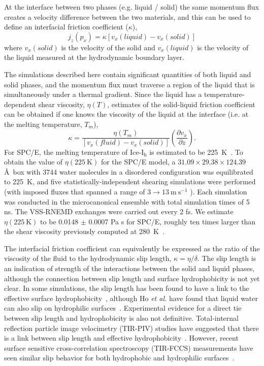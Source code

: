At the interface between two phases (e.g. liquid / solid) the same
momentum flux creates a velocity difference between the two materials,
and this can be used to define an interfacial friction coefficient
($\kappa$),
\begin{equation}\label{Shenyu-13}
j_{z}(p_{x}) = \kappa \left[ v_{x}(liquid) - v_{x}(solid) \right]
\end{equation}
where $v_{x}(solid)$ is the velocity of the solid and $v_{x}(liquid)$
is the velocity of the liquid measured at the hydrodynamic boundary
layer.

The simulations described here contain significant quantities of both
liquid and solid phases, and the momentum flux must traverse a region
of the liquid that is simultaneously under a thermal gradient.  Since
the liquid has a temperature-dependent shear viscosity, $\eta(T)$,
estimates of the solid-liquid friction coefficient can be obtained if
one knows the viscosity of the liquid at the interface (i.e. at the
melting temperature, $T_m$),
\begin{equation}\label{kappa-2}
\kappa = \frac{\eta(T_{m})}{\left[v_{x}(fluid)-v_{x}(solid)\right]}\left(\frac{\partial v_{x}}{\partial z}\right).
\end{equation}
For SPC/E, the melting temperature of Ice-I$_\mathrm{h}$ is estimated
to be 225~K~\cite{Bryk02}.  To obtain the value of
$\eta(225\mathrm{~K})$ for the SPC/E model, a $31.09 \times 29.38
\times 124.39$ \AA\ box with 3744 water molecules in a disordered
configuration was equilibrated to 225~K, and five
statistically-independent shearing simulations were performed (with
imposed fluxes that spanned a range of $3 \rightarrow 13
\mathrm{~m~s}^{-1}$ ).  Each simulation was conducted in the
microcanonical ensemble with total simulation times of 5 ns. The
VSS-RNEMD exchanges were carried out every 2 fs. We estimate
$\eta(225\mathrm{~K})$ to be 0.0148 $\pm$ 0.0007 Pa s for SPC/E,
roughly ten times larger than the shear viscosity previously computed
at 280~K~\cite{Kuang12}.

The interfacial friction coefficient can equivalently be expressed as
the ratio of the viscosity of the fluid to the hydrodynamic slip
length, $\kappa = \eta / \delta$. The slip length is an indication of
strength of the interactions between the solid and liquid phases,
although the connection between slip length and surface hydrophobicity
is not yet clear. In some simulations, the slip length has been found
to have a link to the effective surface
hydrophobicity~\cite{Sendner:2009uq}, although Ho \textit{et al.} have
found that liquid water can also slip on hydrophilic
surfaces~\cite{Ho:2011zr}. Experimental evidence for a direct tie
between slip length and hydrophobicity is also not
definitive. Total-internal reflection particle image velocimetry
(TIR-PIV) studies have suggested that there is a link between slip
length and effective
hydrophobicity~\cite{Lasne:2008vn,Bouzigues:2008ys}. However, recent
surface sensitive cross-correlation spectroscopy (TIR-FCCS)
measurements have seen similar slip behavior for both hydrophobic and
hydrophilic surfaces~\cite{Schaeffel:2013kx}.


